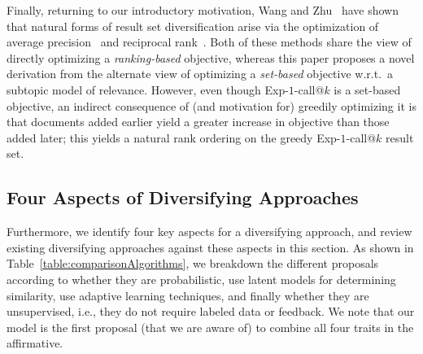  Finally, returning to our
introductory motivation, Wang and Zhu~\cite{wangzhu10} have shown that
natural forms of result set diversification arise via the optimization
of average precision~\cite{ap} and reciprocal rank~\cite{mrr}.  Both
of these methods share the view of directly optimizing a
\emph{ranking-based} objective, whereas this paper proposes a novel
derivation from the alternate view of optimizing a \emph{set-based}
objective w.r.t.\ a subtopic model of relevance.  However, even though
Exp-$1$-call@$k$ is a set-based objective, an indirect consequence of
(and motivation for) greedily optimizing it is that documents added
earlier yield a greater increase in objective than those added later;
this yields a natural rank ordering on the greedy Exp-$1$-call@$k$
result set.

\subsection{Four Aspects of Diversifying Approaches}
Furthermore, we identify four key aspects for a diversifying approach, and review existing diversifying approaches against these aspects in this section. As shown in Table~\ref{table:comparisonAlgorithms}, we breakdown the
different proposals according to whether they are probabilistic, use
latent models for determining similarity, use adaptive learning
techniques, and finally whether they are unsupervised, i.e., they do
not require labeled data or feedback. We note that our model is the first
proposal (that we are aware of) to combine all four traits in the
affirmative. 

